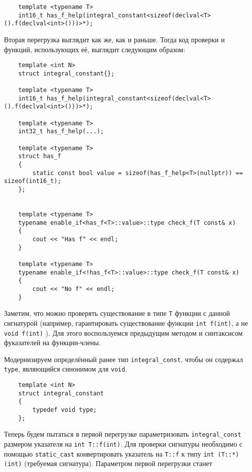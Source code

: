 	\begin{verbatim}
	template <typename T>
	int16_t has_f_help(integral_constant<sizeof(declval<T>().f(declval<int>()))>*);
	\end{verbatim}
	
	Вторая перегрузка выглядит как же, как и раньше. Тогда код проверки и функций, использующих её, выглядит следующим образом:

	\begin{verbatim}
	template <int N>
	struct integral_constant{};

	template <typename T>
	int16_t has_f_help(integral_constant<sizeof(declval<T>().f(declval<int>()))>*);

	template <typename T>
	int32_t has_f_help(...);

	template <typename T>
	struct has_f
	{
	    static const bool value = sizeof(has_f_help<T>(nullptr)) == sizeof(int16_t);
	};


	template <typename T>
	typename enable_if<has_f<T>::value>::type check_f(T const& x)
	{
	    cout << "Has f" << endl;
	}

	template <typename T>
	typename enable_if<!has_f<T>::value>::type check_f(T const& x)
	{
	    cout << "No f" << endl;
	}
	\end{verbatim}

	\vspace{\baselineskip}

	Заметим, что можно проверять существование в типе \texttt{T} функции с данной сигнатурой (например, гарантировать существование функции \texttt{int f(int)}, а не \texttt{void f(int)} ). Для этого воспользуемся предыдущим методом и синтаксисом фуказателей на функции-члены.
	
	Модернизируем определённый ранее тип \texttt{integral_const}, чтобы он содержал \texttt{type}, являющийся синонимом для \texttt{void}.

	\begin{verbatim}
	template <int N>
	struct integral_constant
	{
	    typedef void type;
	};
	\end{verbatim}
	
	Теперь будем пытаться в первой перегрузке параметризовать \texttt{integral_const} размером указателя на \texttt{int T::f(int)}. Для проверки сигнатуры необходимо с помощью \texttt{static_cast} конвертировать указатель на \texttt{T::f} к типу \texttt{int (T::*)(int)} (требуемая сигнатура). Параметром первой перегрузки станет 
	

